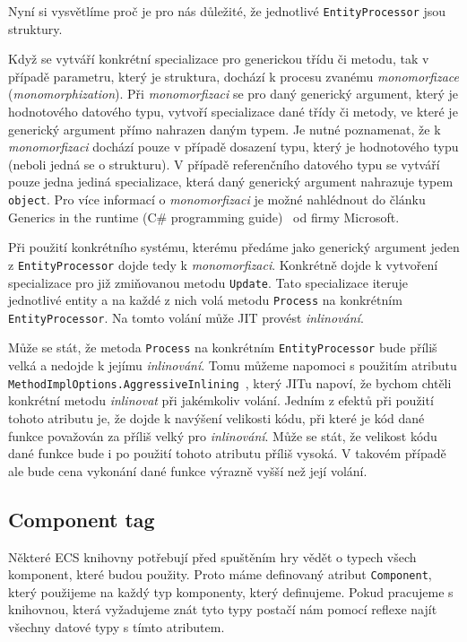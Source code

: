 Nyní si vysvětlíme proč je pro nás důležité, že jednotlivé \verb|EntityProcessor| jsou struktury.

Když se vytváří konkrétní specializace pro generickou třídu či metodu, tak v případě parametru, který je struktura, dochází k procesu zvanému \textit{monomorfizace} (\textit{monomorphization}). Při \textit{monomorfizaci} se pro daný generický argument, který je hodnotového datového typu, vytvoří specializace dané třídy či metody, ve které je generický argument přímo nahrazen daným typem. Je nutné poznamenat, že k \textit{monomorfizaci} dochází pouze v případě dosazení typu, který je hodnotového typu (neboli jedná se o strukturu). V případě referenčního datového typu se vytváří pouze jedna jediná specializace, která daný generický argument nahrazuje typem \verb|object|. Pro více informací o \textit{monomorfizaci} je možné nahlédnout do článku Generics in the runtime (C\# programming guide)~\cite{GenericsInTheRuntime} od firmy Microsoft.

Při použití konkrétního systému, kterému předáme jako generický argument jeden z \verb|EntityProcessor| dojde tedy k \textit{monomorfizaci}. Konkrétně dojde k vytvoření specializace pro již zmiňovanou metodu \verb|Update|. Tato specializace iteruje jednotlivé entity a na každé z nich volá metodu \verb|Process| na konkrétním \verb|EntityProcessor|. Na tomto volání může JIT provést \textit{inlinování}.

Může se stát, že metoda \verb|Process| na konkrétním \verb|EntityProcessor| bude příliš velká a nedojde k jejímu \textit{inlinování}. Tomu můžeme napomoci s použitím atributu \verb|MethodImplOptions.AggressiveInlining|~\cite{MethodImplOptions}, který JITu napoví, že bychom chtěli konkrétní metodu \textit{inlinovat} při jakémkoliv volání. Jedním z efektů při použití tohoto atributu je, že dojde k navýšení velikosti kódu, při které je kód dané funkce považován za příliš velký pro \textit{inlinování}. Může se stát, že velikost kódu dané funkce bude i po použití tohoto atributu příliš vysoká. V takovém případě ale bude cena vykonání dané funkce výrazně vyšší než její volání. 

\subsection{Component tag}
Některé ECS knihovny potřebují před spuštěním hry vědět o typech všech komponent, které budou použity. Proto máme definovaný atribut \verb|Component|, který použijeme na každý typ komponenty, který definujeme. Pokud pracujeme s knihovnou, která vyžadujeme znát tyto typy postačí nám pomocí reflexe najít všechny datové typy s tímto atributem.

